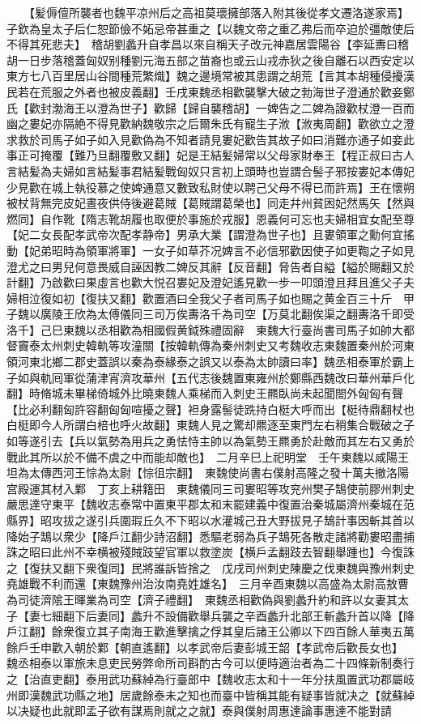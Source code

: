 　　【髪傉儃所襲者也魏平凉州后之高祖莫瓌擁部落入附其後從孝文遷洛遂家焉】子欽為皇太子后仁恕節儉不妬忌帝甚重之【以魏文帝之重乙弗后而卒迫於彊敵使后不得其死悲夫】　稽胡劉蠡升自孝昌以來自稱天子改元神嘉居雲陽谷【李延夀曰稽胡一日步落稽蓋匈奴别種劉元海五部之苗裔也或云山戎赤狄之後自離石以西安定以東方七八百里居山谷間種荒繁熾】魏之邊境常被其患謂之胡荒【言其本胡種侵擾漢民若在荒服之外者也被皮義翻】壬戌東魏丞相歡襲擊大破之勃海世子澄通於歡妾鄭氏【歡封渤海王以澄為世子】歡歸【歸自襲稽胡】一婢告之二婢為證歡杖澄一百而幽之婁妃亦隔絶不得見歡納魏敬宗之后爾朱氏有寵生子浟【浟夷周翻】歡欲立之澄求救於司馬子如子如入見歡偽為不知者請見婁妃歡告其故子如曰消難亦通子如妾此事正可掩覆【難乃旦翻覆敷又翻】妃是王結髪婦常以父母家財奉王【程正叔曰古人言結髪為夫婦如言結髪事君結髪戰匈奴只言初上頭時也豈謂合髻子邪按婁妃本傳妃少見歡在城上執役慕之使婢通意又數致私財使以聘己父母不得已而許焉】王在懷朔被杖背無完皮妃晝夜供侍後避葛賊【葛賊謂葛榮也】同走幷州貧困妃然馬矢【然與燃同】自作靴【隋志靴胡履也取便於事施於戎服】恩義何可忘也夫婦相宜女配至尊【妃二女長配孝武帝次配孝静帝】男承大業【謂澄為世子也】且婁領軍之勳何宜搖動【妃弟昭時為領軍將軍】一女子如草芥况婢言不必信邪歡因使子如更鞫之子如見澄尤之曰男兒何意畏威自誣因教二婢反其辭【反音翻】脅告者自縊【縊於賜翻又於計翻】乃啟歡曰果虛言也歡大悦召婁妃及澄妃遙見歡一步一叩頭澄且拜且進父子夫婦相泣復如初【復扶又翻】歡置酒曰全我父子者司馬子如也賜之黄金百三十斤　甲子魏以廣陵王欣為太傅儀同三司万俟夀洛千為司空【万莫北翻俟渠之翻夀洛千即受洛千】己巳東魏以丞相歡為相國假黄鉞殊禮固辭　東魏大行臺尚書司馬子如帥大都督竇泰太州刺史韓軌等攻潼關【按韓軌傳為秦州刺史又考魏收志東魏置秦州於河東領河東北鄉二郡史蓋誤以秦為泰緣泰之誤又以泰為太帥讀曰率】魏丞相泰軍於霸上子如與軌囘軍從蒲津宵濟攻華州【五代志後魏置東雍州於鄭縣西魏改曰華州華戶化翻】時脩城未畢梯倚城外比曉東魏人乘梯而入刺史王羆臥尚未起聞閤外匈匈有聲【比必利翻匈許容翻匈匈喧擾之聲】袒身露髻徒跣持白梃大呼而出【梃待鼎翻杖也白梃即今人所謂白棓也呼火故翻】東魏人見之驚却羆逐至東門左右稍集合戰破之子如等遂引去【兵以氣勢為用兵之勇怯恃主帥以為氣勢王羆勇於赴敵而其左右又勇於戰此其所以於不備不虞之中而能却敵也】　二月辛巳上祀明堂　壬午東魏以咸陽王坦為太傳西河王悰為太尉【悰徂宗翻】　東魏使尚書右僕射高隆之發十萬夫撤洛陽宫殿運其材入鄴　丁亥上耕籍田　東魏儀同三司婁昭等攻兖州樊子鵠使前膠州刺史嚴思達守東平【魏收志泰常中置東平郡太和末罷建義中復置治秦城屬濟州秦城在范縣界】昭攻拔之遂引兵圍瑕丘久不下昭以水灌城己丑大野拔見子鵠計事因斬其首以降始子鵠以衆少【降戶江翻少詩沼翻】悉驅老弱為兵子鵠死各散走諸將勸婁昭盡捕誅之昭曰此州不幸横被殘賊跂望官軍以救塗炭【横戶孟翻跂去智翻舉踵也】今復誅之【復扶又翻下衆復同】民將誰訴皆捨之　戊戌司州刺史陳慶之伐東魏與豫州刺史堯雄戰不利而還【東魏豫州治汝南堯姓雄名】　三月辛酉東魏以高盛為太尉高敖曹為司徒濟隂王暉業為司空【濟子禮翻】　東魏丞相歡偽與劉蠡升約和許以女妻其太子【妻七細翻下后妻同】蠡升不設備歡舉兵襲之辛酉蠡升北部王斬蠡升首以降【降戶江翻】餘衆復立其子南海王歡進擊擒之俘其皇后諸王公卿以下四百餘人華夷五萬餘戶壬申歡入朝於鄴【朝直遙翻】以孝武帝后妻彭城王韶【孝武帝后歡長女也】　魏丞相泰以軍旅未息吏民勞弊命所司斟酌古今可以便時適治者為二十四條新制奏行之【治直吏翻】泰用武功蘇綽為行臺郎中【魏收志太和十一年分扶風置武功郡屬岐州即漢魏武功縣之地】居歲餘泰未之知也而臺中皆稱其能有疑事皆就决之【就蘇綽以决疑也此就即孟子欲有謀焉則就之之就】泰與僕射周惠達論事惠達不能對請